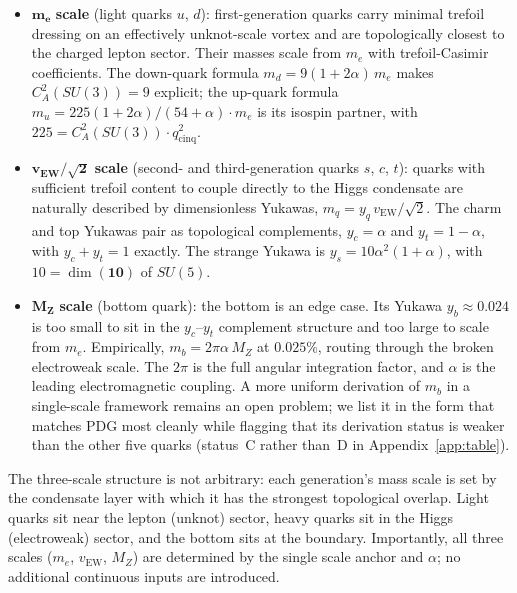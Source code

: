 \documentclass[11pt]{article}
\newcommand{\CA}{C_A}
\begin{document}
\begin{itemize}
\item $\boldsymbol{m_e}$ \textbf{scale} (light quarks $u$, $d$):
  first-generation quarks carry minimal trefoil dressing on an
  effectively unknot-scale vortex and are topologically closest to
  the charged lepton sector.  Their masses scale from $m_e$ with
  trefoil-Casimir coefficients.  The down-quark formula
  $m_d = 9(1{+}2\alpha)\,m_e$ makes $\CA^2(SU(3)) = 9$ explicit;
  the up-quark formula
  $m_u = 225(1{+}2\alpha)/(54{+}\alpha)\cdot m_e$ is its isospin
  partner, with $225 = \CA^2(SU(3))\cdot q^2_\text{cinq}$.
\item $\boldsymbol{v_\textbf{EW}/\sqrt{2}}$ \textbf{scale} (second- and
  third-generation quarks $s$, $c$, $t$): quarks with sufficient
  trefoil content to couple directly to the Higgs condensate are
  naturally described by dimensionless Yukawas,
  $m_q = y_q\,v_\text{EW}/\sqrt{2}$.  The charm and top Yukawas
  pair as topological complements, $y_c = \alpha$ and
  $y_t = 1-\alpha$, with $y_c + y_t = 1$ exactly.  The strange
  Yukawa is $y_s = 10\alpha^2(1{+}\alpha)$, with
  $10 = \dim(\mathbf{10})$ of $SU(5)$.
\item $\boldsymbol{M_Z}$ \textbf{scale} (bottom quark): the bottom is an edge
  case.  Its Yukawa $y_b \approx 0.024$ is too small to sit in the
  $y_c$--$y_t$ complement structure and too large to scale from
  $m_e$.  Empirically, $m_b = 2\pi\alpha\,M_Z$ at $0.025\%$,
  routing through the broken electroweak scale.  The $2\pi$ is
  the full angular integration factor, and $\alpha$ is the leading
  electromagnetic coupling.  A more uniform derivation of $m_b$ in
  a single-scale framework remains an open problem; we list it
  in the form that matches PDG most cleanly while flagging that
  its derivation status is weaker than the other five quarks
  (status~C rather than~D in Appendix~\ref{app:table}).
\end{itemize}

The three-scale structure is not arbitrary: each generation's mass
scale is set by the condensate layer with which it has the
strongest topological overlap.  Light quarks sit near the lepton
(unknot) sector, heavy quarks sit in the Higgs (electroweak)
sector, and the bottom sits at the boundary.  Importantly, all
three scales ($m_e$, $v_\text{EW}$, $M_Z$) are determined by the
single scale anchor and $\alpha$; no additional continuous inputs
are introduced.

\end{document}
